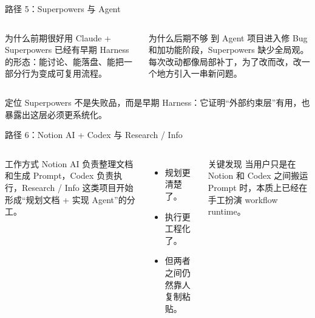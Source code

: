 \documentclass[theme=workflow,aspectratio=169,fontset=tech]{Hypo-Slide}
\begin{document}
\begin{frame}{路径 5：Superpowers 与 Agent}
  \begin{columns}[T,totalwidth=\textwidth]
    \begin{exampleblock}{为什么前期很好用}
      Claude + Superpowers 已经有早期 Harness 的形态：能讨论、能落盘、能把一部分行为变成可复用流程。
    \end{exampleblock}
    \begin{alertblock}{为什么后期不够}
      到 Agent 项目进入修 Bug 和加功能阶段，Superpowers 缺少全局观。每次改动都像局部补丁，为了改而改，改一个地方引入一串新问题。
    \end{alertblock}
  \end{columns}
  \vspace{0.35cm}
  \begin{block}{定位}
    Superpowers 不是失败品，而是早期 Harness：它证明“外部约束层”有用，也暴露出这层必须更系统化。
  \end{block}
\end{frame}

\begin{frame}{路径 6：Notion AI + Codex 与 Research / Info}
  \begin{columns}[T,totalwidth=\textwidth]
    \begin{block}{工作方式}
      Notion AI 负责整理文档和生成 Prompt，Codex 负责执行，Research / Info 这类项目开始形成“规划文档 + 实现 Agent”的分工。
    \end{block}
    \begin{itemize}
      \item 规划更清楚了。
      \item 执行更工程化了。
      \item 但两者之间仍然靠人复制粘贴。
    \end{itemize}
    \begin{alertblock}{关键发现}
      当用户只是在 Notion 和 Codex 之间搬运 Prompt 时，本质上已经在手工扮演 workflow runtime。
    \end{alertblock}
  \end{columns}
\end{frame}
\end{document}
